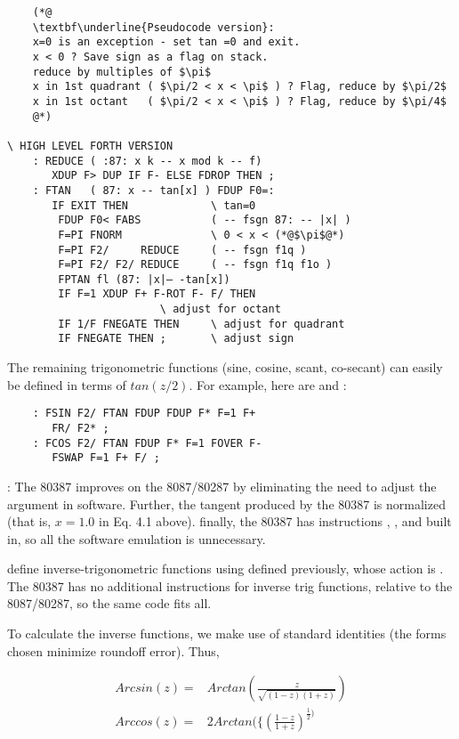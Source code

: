 \begin{lstlisting}
    (*@
    \textbf\underline{Pseudocode version}:
    x=0 is an exception - set tan =0 and exit.
    x < 0 ? Save sign as a flag on stack.
    reduce by multiples of $\pi$
    x in 1st quadrant ( $\pi/2 < x < \pi$ ) ? Flag, reduce by $\pi/2$
    x in 1st octant   ( $\pi/2 < x < \pi$ ) ? Flag, reduce by $\pi/4$
    @*)

\ HIGH LEVEL FORTH VERSION
    : REDUCE ( :87: x k -- x mod k -- f)
       XDUP F> DUP IF F- ELSE FDROP THEN ;
    : FTAN   ( 87: x -- tan[x] ) FDUP F0=:
       IF EXIT THEN             \ tan=0
        FDUP F0< FABS           ( -- fsgn 87: -- |x| )
        F=PI FNORM              \ 0 < x < (*@$\pi$@*)
        F=PI F2/     REDUCE     ( -- fsgn f1q )
        F=PI F2/ F2/ REDUCE     ( -- fsgn f1q f1o )
        FPTAN fl (87: |x|— -tan[x])
        IF F=1 XDUP F+ F-ROT F- F/ THEN
                        \ adjust for octant
        IF 1/F FNEGATE THEN     \ adjust for quadrant
        IF FNEGATE THEN ;       \ adjust sign
\end{lstlisting}

The remaining trigonometric functions (sine, cosine, scant, co-secant) can easily be defined in terms of $tan(z /2)$. For example, here are  and :

\begin{lstlisting}
    : FSIN F2/ FTAN FDUP FDUP F* F=1 F+
       FR/ F2* ;
    : FCOS F2/ FTAN FDUP F* F=1 FOVER F-
       FSWAP F=1 F+ F/ ;
\end{lstlisting}

\leftbar[1\linewidth]
\Note: The 80387 improves on the 8087/80287 by eliminating the
need to adjust the argument in software. Further, the tangent
produced by the 80387 is normalized (that is, $x = 1.0$ in Eq. 4.1
above). finally, the 80387 has instructions , , and  built in, so all the software emulation is unnecessary.
\endleftbar

 define inverse-trigonometric functions using  defined previously, whose action is . The 80387 has no additional instructions for inverse trig functions, relative to the 8087/80287, so the same code fits all.

To calculate the inverse functions, we make use of standard identities (the forms chosen minimize roundoff error). Thus,

\begin{align}
    Arcsin(z) =& Arctan\left(\frac{z}{\sqrt{(1-z)(1+z)}}\right) \\
    Arccos(z) =& 2 Arctan\Big(\{\left(\frac{1-z}{1+z}\right)^{\frac{1}{2}\Big)}
\end{align}

